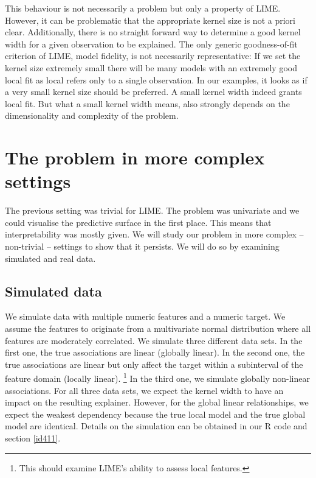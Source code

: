 \documentclass[
]{krantz}
\begin{document}
This behaviour is not necessarily a problem but only a property of LIME.
However, it can be problematic that the appropriate kernel size is not a priori clear.
Additionally, there is no straight forward way to determine a good kernel width for a given observation to be explained.
The only generic goodness-of-fit criterion of LIME, model fidelity, is not necessarily representative:
If we set the kernel size extremely small there will be many models with an extremely good local fit as local refers only to a single observation.
In our examples, it looks as if a very small kernel size should be preferred.
A small kernel width indeed grants local fit.
But what a small kernel width means, also strongly depends on the dimensionality and complexity of the problem.

\hypertarget{id4}{%
\section{The problem in more complex settings}\label{id4}}

The previous setting was trivial for LIME.
The problem was univariate and we could visualise the predictive surface in the first place.
This means that interpretability was mostly given.
We will study our problem in more complex -- non-trivial -- settings to show that it persists.
We will do so by examining simulated and real data.

\hypertarget{id41}{%
\subsection{Simulated data}\label{id41}}

We simulate data with multiple numeric features and a numeric target.
We assume the features to originate from a multivariate normal distribution where all features are moderately correlated.
We simulate three different data sets.
In the first one, the true associations are linear (globally linear).
In the second one, the true associations are linear but only affect the target within a subinterval of the feature domain (locally linear).
\footnote{This should examine LIME's ability to assess local features.}
In the third one, we simulate globally non-linear associations.
For all three data sets, we expect the kernel width to have an impact on the resulting explainer.
However, for the global linear relationships, we expect the weakest dependency because the true local model and the true global model are identical.
Details on the simulation can be obtained in our R code and section \ref{id411}.
\end{document}
